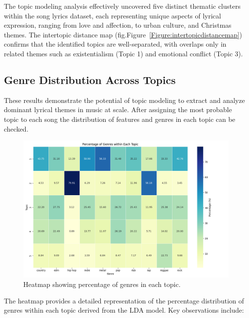 The topic modeling analysis effectively uncovered five distinct thematic
clusters within the song lyrics dataset, each representing unique aspects of
lyrical expression, ranging from love and affection, to urban culture, and
Christmas themes. The intertopic distance map
(fig.Figure~\ref{Figure:intertopicdistancemap}) confirms that the identified topics
are well-separated, with overlaps only in related themes such as existentialism
(Topic 1) and emotional conflict (Topic 3).


\subsection{Genre Distribution Across Topics}
These results demonstrate the potential of topic modeling to extract and
analyze dominant lyrical themes in music at scale. After assigning the most
probable topic to each song the distribution of features and genres in each
topic can be checked.


\begin{center}
\begin{figure}[H]
  \centering
  \includegraphics[width=5in]{img/lda_genres_distribution.png}
  \caption{Heatmap showing percentage of genres in each topic.}
  \label{Figure:fig_eh}
\end{figure}
\end{center}

The heatmap provides a detailed representation of the percentage distribution
of genres within each topic derived from the LDA model. Key observations
include:

